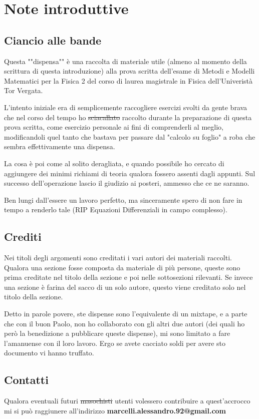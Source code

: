 \chapter{Note introduttive}

\section{Ciancio alle bande}

Questa ""dispensa"" è una raccolta di materiale utile (almeno al momento della scrittura di questa introduzione) alla prova scritta dell'esame  di Metodi e Modelli Matematici per la Fisica 2 del corso di laurea magistrale in Fisica dell'Univeristà Tor Vergata. 

L'intento iniziale era di semplicemente raccogliere esercizi svolti da gente brava che nel corso del tempo ho \st{sciacallato} raccolto durante la preparazione di questa prova scritta, come esercizio personale ai fini di comprenderli al meglio, modificandoli quel tanto che bastava per passare dal "calcolo su foglio" a roba che sembra effettivamente una dispensa. 

La cosa è poi come al solito deragliata,  e quando possibile ho cercato di aggiungere dei minimi richiami di teoria qualora fossero assenti dagli appunti.
Sul successo dell'operazione lascio il giudizio ai posteri, ammesso che ce ne saranno.


Ben lungi dall'essere un lavoro perfetto, ma sinceramente spero di non fare in tempo a renderlo tale (RIP Equazioni Differenziali in campo complesso). 

\section{Crediti}

Nei titoli degli argomenti sono creditati i vari autori dei materiali raccolti. Qualora una sezione fosse composta da materiale di più persone, queste sono prima creditate nel titolo della sezione e poi nelle sottosezioni rilevanti. Se invece una sezione è farina del sacco di un solo autore, questo viene creditato solo nel titolo della sezione.

Detto in parole povere, ste dispense sono l'equivalente di un mixtape, e a parte che con il buon Paolo, non ho collaborato con gli altri due autori (dei quali ho però la benedizione a pubblicare queste dispense), mi sono limitato a fare l'amanuense con il loro lavoro. Ergo se avete cacciato soldi per avere sto documento vi hanno truffato.

\section{Contatti}

Qualora eventuali futuri \st{masochisti} utenti volessero contribuire a quest'accrocco mi si può raggiunere all'indirizzo \textbf{marcelli.alessandro.92@gmail.com}


